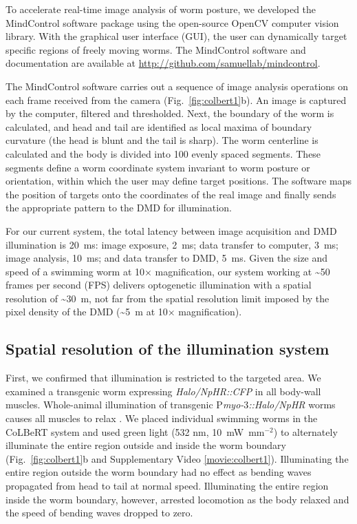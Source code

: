 \begin{FPfigure}
\end{FPfigure}

To accelerate real-time image analysis of worm posture, we developed the MindControl software package using the open-source OpenCV computer vision library\citep{bradski_opencv_2000}. With the graphical user interface (GUI), the user can dynamically target specific regions of freely moving worms. The MindControl software and documentation are available at \href{http://github.com/samuellab/mindcontrol}{http://github.com/samuellab/mindcontrol}.


The MindControl software carries out a sequence of image analysis operations on each frame received from the camera (Fig.~\ref{fig:colbert1}b). An image is captured by the computer, filtered and thresholded. Next, the boundary of the worm is calculated, and head and tail are identified as local maxima of boundary curvature (the head is blunt and the tail is sharp). The worm centerline is calculated and the body is divided into 100 evenly spaced segments. These segments define a worm coordinate system invariant to worm posture or orientation, within which the user may define target positions. The software maps the position of targets onto the coordinates of the real image and finally sends the appropriate pattern to the DMD for illumination.

For our current system, the total latency between image acquisition and DMD illumination is 20~ms: image exposure, 2~ms; data transfer to computer, 3~ms; image analysis, 10~ms; and data transfer to DMD, 5~ms. Given the size and speed of a swimming worm at 10× magnification, our system working at \textasciitilde50 frames per second (FPS) delivers optogenetic illumination with a spatial resolution of \textasciitilde30~\textmu m, not far from the spatial resolution limit imposed by the pixel density of the DMD (\textasciitilde5~\textmu m at 10× magnification).

\subsection{Spatial resolution of the illumination system}
First, we confirmed that illumination is restricted to the targeted area. We examined a transgenic worm expressing \textit{Halo/NpHR::CFP} in all body-wall muscles. Whole-animal illumination of transgenic P\textit{myo-$3$::Halo/NpHR} worms causes all muscles to relax \citep{zhang_multimodal_2007}. We placed individual swimming worms in the CoLBeRT system and used green light (532 nm, 10~mW~mm$^{-2}$) to alternately illuminate the entire region outside and inside the worm boundary (Fig.~\ref{fig:colbert1}b and Supplementary Video \ref{movie:colbert1}). Illuminating the entire region outside the worm boundary had no effect as bending waves propagated from head to tail at normal speed. Illuminating the entire region inside the worm boundary, however, arrested locomotion as the body relaxed and the speed of bending waves dropped to zero.

